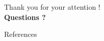 \documentclass[10pt]{beamer}
\newcommand{\imp}[1]{\textbf{\color{cyan}#1}}
\begin{document}
	
	\begin{frame}{}
		\begin{center}
			\huge Thank you for your attention ! \\
			\imp{Questions ?}
		\end{center}
	\end{frame}
	
	
	\appendix
	
	\begin{frame}[shrink=40, fragile]{References}
		\begin{multicols}{2}
			
			
		\end{multicols}
	\end{frame}
	
\end{document}
